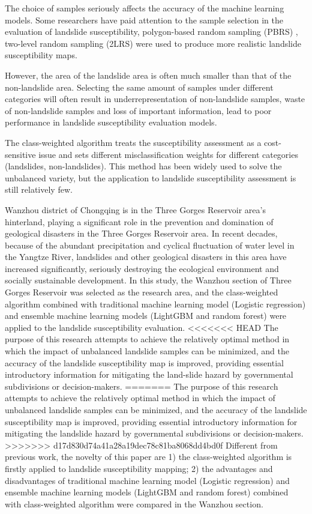 \documentclass[a4paper,fleqn]{cas-sc}
\begin{document}
The choice of samples seriously affects the accuracy of the machine learning models. 
Some researchers have paid attention to the sample selection in the evaluation of landslide susceptibility, polygon-based random sampling (PBRS) \citep{San2014IJoAEOaG}, two-level random sampling (2LRS) \citep{Ada2017NH, Aktas2019C&G} were used to produce more realistic landslide susceptibility maps.

However, the area of the landslide area is often much smaller than that of the non-landslide area. 
Selecting the same amount of samples under different categories will often result in underrepresentation of non-landslide samples, waste of non-landslide samples and loss of important information, lead to poor performance in landslide susceptibility evaluation models.

The class-weighted algorithm treats the susceptibility assessment as a cost-sensitive issue and sets different misclassification weights for different categories (landslides, non-landslides). 
This method has been widely used to solve the unbalanced variety, but the application to landslide susceptibility assessment is still relatively few.



Wanzhou district of Chongqing is in the Three Gorges Reservoir area's hinterland, playing a significant role in the prevention and domination of geological disasters in the Three Gorges Reservoir area. 
In recent decades, because of the abundant precipitation and cyclical fluctuation of water level in the Yangtze River, landslides and other geological disasters in this area have increased significantly, seriously destroying the ecological environment and socially sustainable development. 
In this study, the Wanzhou section of Three Gorges Reservoir was selected as the research area, and the class-weighted algorithm combined with traditional machine learning model (Logistic regression) and ensemble machine learning models (LightGBM and random forest) were applied to the landslide susceptibility evaluation. 
<<<<<<< HEAD
The purpose of this research attempts to achieve the relatively optimal method in which the impact of unbalanced landslide samples can be minimized, and the accuracy of the landslide susceptibility map is improved, providing essential introductory information for mitigating the land-slide hazard by governmental subdivisions or decision-makers. 
=======
The purpose of this research attempts to achieve the relatively optimal method in which the impact of unbalanced landslide samples can be minimized, and the accuracy of the landslide susceptibility map is improved, providing essential introductory information for mitigating the landslide hazard by governmental subdivisions or decision-makers. 
>>>>>>> d17d830d74a41a28a19dec78c81ba8068dd4bd0f
Different from previous work, the novelty of this paper are 1) the class-weighted algorithm is firstly applied to landslide susceptibility mapping; 2) the advantages and disadvantages of traditional machine learning model (Logistic regression) and ensemble machine learning models (LightGBM and random forest) combined with class-weighted algorithm were compared in the Wanzhou section.
\end{document}
